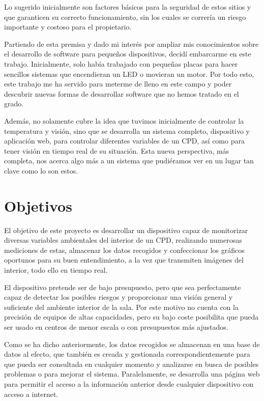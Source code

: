 Lo sugerido inicialmente son factores básicos para la seguridad de estos sitios y que garanticen su correcto funcionamiento, sin los cuales se correría un riesgo importante y costoso para el propietario.

Partiendo de esta premisa y dado mi interés por ampliar mis conocimientos sobre el desarrollo de software para pequeños dispositivos, decidí embarcarme en este trabajo. Inicialmente, solo había trabajado con pequeñas placas para hacer sencillos sistemas que encendieran un LED o movieran un motor. Por todo esto, este trabajo me ha servido para meterme de lleno en este campo y poder descubrir nuevas formas de desarrollar software que no hemos tratado en el grado.

Además, no solamente cubre la idea que tuvimos inicialmente de controlar la temperatura y visión, sino que se desarrolla un sistema completo, dispositivo y aplicación web, para controlar diferentes variables de un CPD, así como para tener visión en tiempo real de su situación. Esta nueva perspectiva, más completa, nos acerca algo más a un sistema que pudiéramos ver en un lugar tan clave como lo son estos.

\section{Objetivos}\label{sec:objetivos}
El objetivo de este proyecto es desarrollar un dispositivo capaz de monitorizar diversas variables ambientales del interior de un CPD, realizando numerosas mediciones de estas, almacenar los datos recogidos y confeccionar los gráficos oportunos para su buen entendimiento, a la vez que transmiten imágenes del interior, todo ello en tiempo real.

El dispositivo pretende ser de bajo presupuesto, pero que sea perfectamente capaz de detectar los posibles riesgos y proporcionar una visión general y suficiente del ambiente interior de la sala. Por este motivo no cuenta con la precisión de equipos de altas capacidades, pero su bajo coste posibilita que pueda ser usado en centros de menor escala o con presupuestos más ajustados.

Como se ha dicho anteriormente, los datos recogidos se almacenan en una base de datos al efecto, que también es creada y gestionada correspondientemente para que pueda ser consultada en cualquier momento y analizarse en busca de posibles problemas o para mejorar el sistema. Paralelamente, se desarrolla una página web para permitir el acceso a la información anterior desde cualquier dispositivo con acceso a internet.

